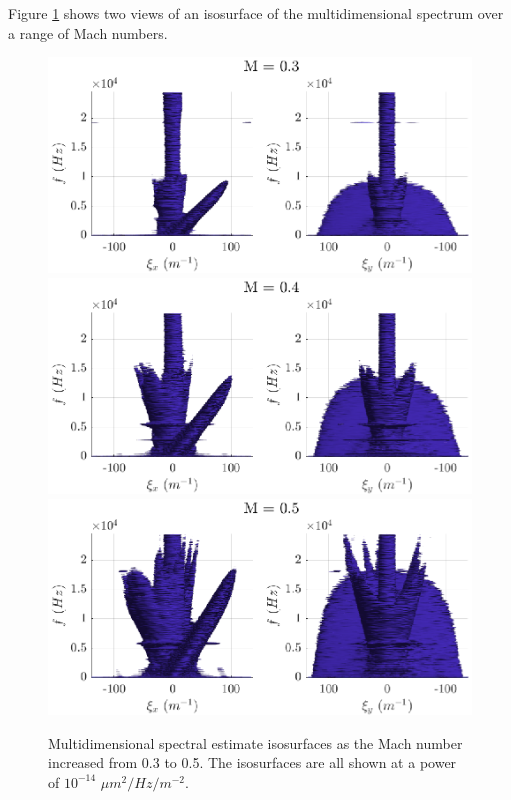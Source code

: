 Figure \ref{fig:04_dispersion_mach} shows two views of an isosurface of the multidimensional spectrum over a range of Mach numbers.
\begin{figure}
  \centering
  \includegraphics{../matlab/04_dispersion_analysis/dispersion_mach_0.3.eps}
  \includegraphics{../matlab/04_dispersion_analysis/dispersion_mach_0.4.eps}
  \includegraphics{../matlab/04_dispersion_analysis/dispersion_mach_0.5.eps}
  \caption{Multidimensional spectral estimate isosurfaces as the Mach number increased from 0.3 to 0.5. The isosurfaces are all shown at a power of $10^{-14}$ $\mu m^2/Hz/m^{-2}$.}
  \label{fig:04_dispersion_mach}
\end{figure}
